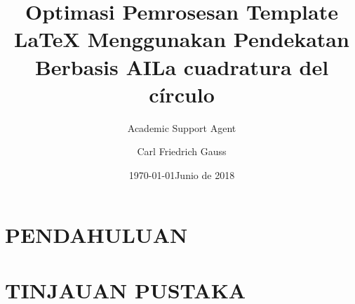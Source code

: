\documentclass{Tesis}
\title{Optimasi Pemrosesan Template LaTeX Menggunakan Pendekatan Berbasis AI}
\author{Academic Support Agent}
\date{\today}
\begin{document}
\maketitle

\begin{abstract}

\end{abstract}

\chapter{PENDAHULUAN}


\chapter{TINJAUAN PUSTAKA}


\usepackage{lipsum}

\title{La cuadratura del círculo}
\author{Carl Friedrich Gauss}
\date{Junio de 2018}
\graphicspath{{./figuras/}}
\end{document}
